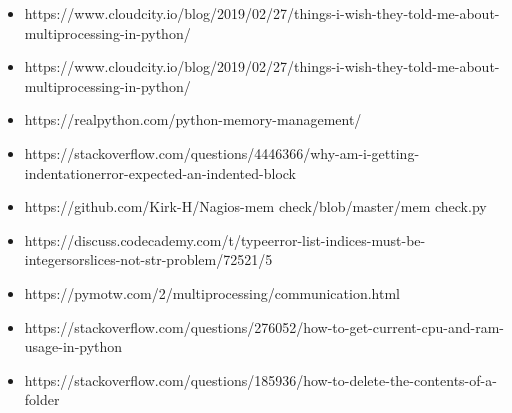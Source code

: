 \documentclass[onecolumn]{article}
\begin{document}
\begin{itemize}
\item https://www.cloudcity.io/blog/2019/02/27/things-i-wish-they-told-me-about-multiprocessing-in-python/
\item https://www.cloudcity.io/blog/2019/02/27/things-i-wish-they-told-me-about-multiprocessing-in-python/
\item https://realpython.com/python-memory-management/
\item https://stackoverflow.com/questions/4446366/why-am-i-getting-indentationerror-expected-an-indented-block
\item https://github.com/Kirk-H/Nagios-mem check/blob/master/mem check.py
\item https://discuss.codecademy.com/t/typeerror-list-indices-must-be-integersorslices-not-str-problem/72521/5
\item https://pymotw.com/2/multiprocessing/communication.html
\item https://stackoverflow.com/questions/276052/how-to-get-current-cpu-and-ram-usage-in-python
\item https://stackoverflow.com/questions/185936/how-to-delete-the-contents-of-a-folder
\end{itemize}






\nocite{*}


\end{document}
